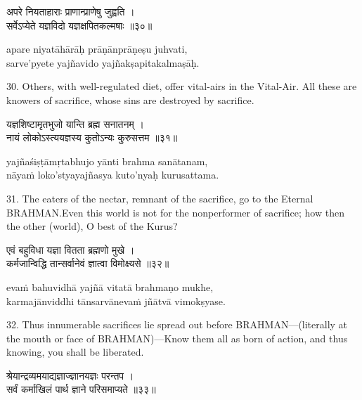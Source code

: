 \begin{gitaverse}
अपरे नियताहाराः प्राणान्प्राणेषु जुह्वति । \\
सर्वेऽप्येते यज्ञविदो यज्ञक्षपितकल्मषाः ॥३०॥
\end{gitaverse}

\begin{transliteration}
apare niyatāhārāḥ prāṇānprāṇeṣu juhvati, \\
sarve'pyete yajñavido yajñakṣapitakalmaṣāḥ.
\end{transliteration}

30. Others, with well-regulated diet, offer vital-airs in the Vital-Air. All
these are knowers of sacrifice, whose sins are destroyed by sacrifice.

\begin{gitaverse}
यज्ञशिष्टामृतभुजो यान्ति ब्रह्म सनातनम् । \\
नायं लोकोऽस्त्ययज्ञस्य कुतोऽन्यः कुरुसत्तम ॥३१॥
\end{gitaverse}

\begin{transliteration}
yajñaśiṣṭāmṛtabhujo yānti brahma sanātanam, \\
nāyaṁ loko'styayajñasya kuto'nyaḥ kurusattama.
\end{transliteration}

31. The eaters of the nectar, remnant of the sacrifice, go to the Eternal
BRAHMAN.\@ Even this world is not for the nonperformer of sacrifice; how then
the other (world), O best of the Kurus?

\begin{gitaverse}
एवं बहुविधा यज्ञा वितता ब्रह्मणो मुखे । \\
कर्मजान्विद्धि तान्सर्वानेवं ज्ञात्वा विमोक्ष्यसे ॥३२॥
\end{gitaverse}

\begin{transliteration}
evaṁ bahuvidhā yajñā vitatā brahmaṇo mukhe, \\
karmajānviddhi tānsarvānevaṁ jñātvā vimokṣyase.
\end{transliteration}

32. Thus innumerable sacrifices lie spread out before BRAHMAN---(literally at
the mouth or face of BRAHMAN)---Know them all as born of action, and thus
knowing, you shall be liberated.

\begin{gitaverse}
श्रेयान्द्रव्यमयाद्यज्ञाज्ज्ञानयज्ञः परन्तप । \\
सर्वं कर्माखिलं पार्थ ज्ञाने परिसमाप्यते ॥३३॥
\end{gitaverse}

